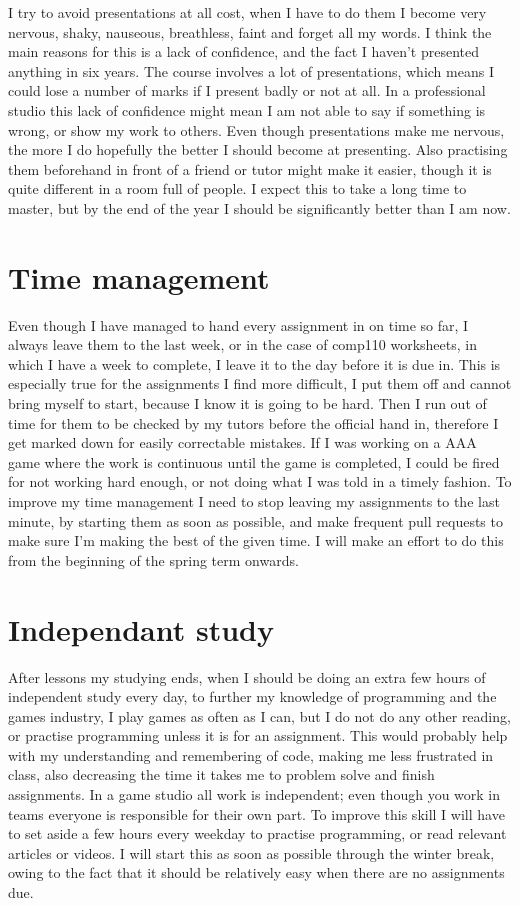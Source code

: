 \documentclass{scrartcl}
\begin{document}
I try to avoid presentations at all cost, when I have to do them I become very nervous, shaky, nauseous, breathless, faint and forget all my words. I think the main reasons for this is a lack of confidence, and the fact I haven't presented anything in six years. The course involves a lot of presentations, which means I could lose a number of marks if I present badly or not at all. In a professional studio this lack of confidence might mean I am not able to say if something is wrong, or show my work to others. Even though presentations make me nervous, the more I do hopefully the better I should become at presenting. Also practising them beforehand in front of a friend or tutor might make it easier, though it is quite different in a room full of people. I expect this to take a long time to master, but by the end of the year I should be significantly better than I am now.

\section{Time management}

Even though I have managed to hand every assignment in on time so far, I always leave them to the last week, or in the case of comp110 worksheets, in which I have a week to complete, I leave it to the day before it is due in. This is especially true for the assignments I find more difficult, I put them off and cannot bring myself to start, because I know it is going to be hard. Then I run out of time for them to be checked by my tutors before the official hand in, therefore I get marked down for easily correctable mistakes. If I was working on a AAA game where the work is continuous until the game is completed, I could be fired for not working hard enough, or not doing what I was told in a timely fashion. To improve my time management I need to stop leaving my assignments to the last minute, by starting them as soon as possible, and make frequent pull requests to make sure I'm making the best of the given time. I will make an effort to do this from the beginning of the spring term onwards.

\section{Independant study}

After lessons my studying ends, when I should be doing an extra few hours of independent study every day, to further my knowledge of programming and the games industry, I play games as often as I can, but I do not do any other reading, or practise programming unless it is for an assignment. This would probably help with my understanding and remembering of code, making me less frustrated in class, also decreasing the time it takes me to problem solve and finish assignments. In a game studio all work is independent; even though you work in teams everyone is responsible for their own part. To improve this skill I will have to set aside a few hours every weekday to practise programming, or read relevant articles or videos. I will start this as soon as possible through the winter break, owing to the fact that it should be relatively easy when there are no assignments due.
\end{document}

